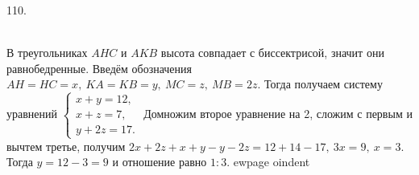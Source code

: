 110. \begin{figure}[ht!]
\end{figure}\\
В треугольниках $AHC$ и $AKB$ высота совпадает с биссектрисой, значит они равнобедренные. Введём обозначения $AH=HC=x,\ KA=KB=y,\ MC=z,\ MB=2z.$ Тогда получаем систему уравнений $\begin{cases} x+y=12,\\ x+z=7,\\ y+2z=17.\end{cases}$ Домножим второе уравнение на 2, сложим с первым и вычтем третье, получим $2x+2z+x+y-y-2z=12+14-17,\ 3x=9,\ x=3.$ Тогда $y=12-3=9$ и отношение равно $1:3.$
ewpage
oindent
